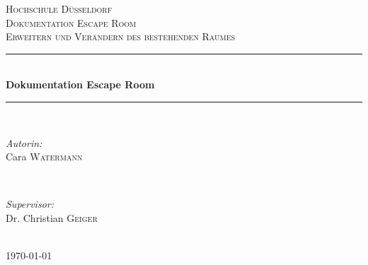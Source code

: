 \documentclass[12pt]{article} %
\begin{document}

\begin{titlepage}

	\newcommand{\HRule}{\rule{\linewidth}{0.5mm}} %

	\center %


	\textsc{\LARGE Hochschule Düsseldorf}\\[1.5cm] %
	\textsc{\Large Dokumentation Escape Room}\\[0.5cm] %
	\textsc{\large Erweitern und Verändern des bestehenden Raumes}\\[0.5cm] %

	\HRule \\[0.4cm]
	{ \huge \bfseries Dokumentation Escape Room}\\[0.4cm] %
	\HRule \\[1.5cm]

	\begin{minipage}{0.4\textwidth}
		\begin{flushleft} \large
			\emph{Autorin:}\\
			Cara \textsc{Watermann} %
		\end{flushleft}
	\end{minipage}
	~
	\begin{minipage}{0.4\textwidth}
		\begin{flushright} \large
			\emph{Supervisor:} \\
			Dr. Christian \textsc{Geiger} %
		\end{flushright}
	\end{minipage}\\[4cm]

	{\large \today}\\[3cm] %


	\vfill %

\end{titlepage}
\end{document}
